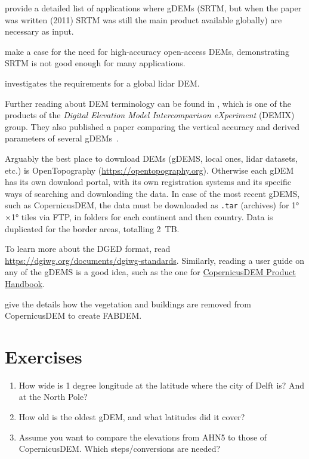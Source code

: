 \citet{Yang11} provide a detailed list of applications where gDEMs (SRTM, but when the paper was written (2011) SRTM was still the main product available globally) are necessary as input.

\citet{Schumann2018} make a case for the need for high-accuracy open-access DEMs, demonstrating SRTM is not good enough for many applications.

\citet{Hancock2021} investigates the requirements for a global lidar DEM\@.

Further reading about DEM terminology can be found in \citet{Guth21}, which is one of the products of the \emph{Digital Elevation Model Intercomparison eXperiment} (DEMIX) group.
They also published a paper comparing the vertical accuracy and derived parameters of several gDEMs~\citep{Guth24}.

Arguably the best place to download DEMs (gDEMS, local ones, lidar datasets, etc.) is OpenTopography (\url{https://opentopography.org}).
Otherwise each gDEM has its own download portal, with its own registration systems and its specific ways of searching and downloading the data.
In case of the most recent gDEMS, such as CopernicusDEM, the data must be downloaded as \texttt{.tar} (archives) for \ang{1}$\times$\ang{1} tiles via FTP, in folders for each continent and then country.
Data is duplicated for the border areas, totalling \qty{2}{TB}.

To learn more about the DGED format, read \url{https://dgiwg.org/documents/dgiwg-standards}.
Similarly, reading a user guide on any of the gDEMS is a good idea, such as the one for \href{https://spacedata.copernicus.eu/documents/20126/0/GEO1988-CopernicusDEM-SPE-002_ProductHandbook_I3.0+%281%29.pdf}{CopernicusDEM Product Handbook}.

\citet{Hawker22} give the details how the vegetation and buildings are removed from CopernicusDEM to create FABDEM\@.

%
\section{Exercises}

\begin{enumerate}
  \item How wide is 1 degree longitude at the latitude where the city of Delft is? And at the North Pole?
  \item How old is the oldest gDEM, and what latitudes did it cover?
  \item Assume you want to compare the elevations from AHN5 to those of CopernicusDEM\@. Which steps/conversions are needed?
\end{enumerate}
